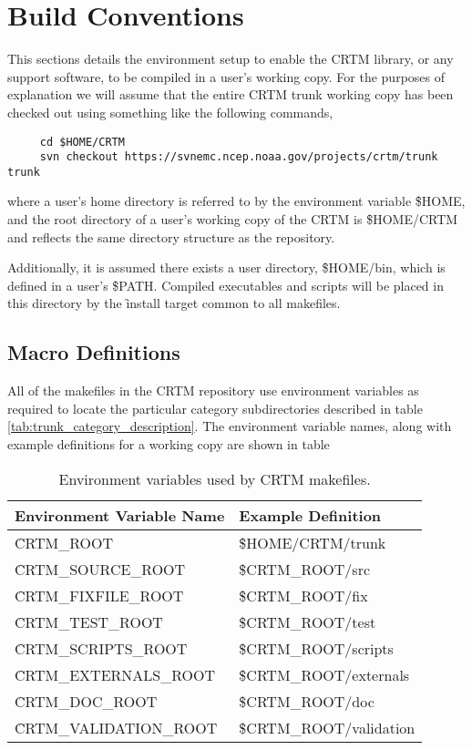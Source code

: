 \chapter{Build Conventions}
This sections details the environment setup to enable the CRTM library, or any support software, to be compiled in a user's working copy. For the purposes of explanation we will assume that the entire CRTM trunk working copy has been checked out using something like the following commands,
\begin{ttfamily}
  \begin{verbatim}
     cd $HOME/CRTM
     svn checkout https://svnemc.ncep.noaa.gov/projects/crtm/trunk trunk\end{verbatim}
\end{ttfamily}
where a user's home directory is referred to by the environment variable \f{\$HOME}, and the root directory of a user's working copy of the CRTM is \f{\$HOME/CRTM} and reflects the same directory structure as the repository.

Additionally, it is assumed there exists a user directory, \f{\$HOME/bin}, which is defined in a user's \f{\$PATH}. Compiled executables and scripts will be placed in this directory by the \f{install} target common to all makefiles.


\section{Macro Definitions}
All of the makefiles in the CRTM repository use environment variables as required to locate the particular category subdirectories described in table \ref{tab:trunk_category_description}. The environment variable names, along with example definitions for a working copy are shown in table

\begin{table}[htb]
  \centering
  \begin{tabular}{p{6.5cm} p{7.5cm}}
    \hline
    \sffamily\textbf{Environment Variable Name} & \sffamily\textbf{Example Definition} \\
    \hline\hline
    \f{CRTM\_ROOT}              & \f{\$HOME/CRTM/trunk} \\
    \f{CRTM\_SOURCE\_ROOT}      & \f{\$CRTM\_ROOT/src}\\
    \f{CRTM\_FIXFILE\_ROOT}     & \f{\$CRTM\_ROOT/fix} \\
    \f{CRTM\_TEST\_ROOT}        & \f{\$CRTM\_ROOT/test} \\
    \f{CRTM\_SCRIPTS\_ROOT}     & \f{\$CRTM\_ROOT/scripts} \\
    \f{CRTM\_EXTERNALS\_ROOT}   & \f{\$CRTM\_ROOT/externals} \\
    \f{CRTM\_DOC\_ROOT}         & \f{\$CRTM\_ROOT/doc} \\
    \f{CRTM\_VALIDATION\_ROOT}  & \f{\$CRTM\_ROOT/validation} \\
    \hline
  \end{tabular}
  \caption{Environment variables used by CRTM makefiles.}
  \label{tab:macro_description}
\end{table}


